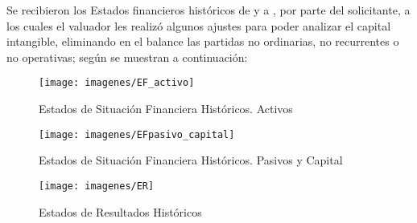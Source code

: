 Se recibieron los Estados financieros hist\'oricos de \EFde{} y a \EFhasta, por parte del  solicitante,  a los cuales el valuador les realiz\'o algunos ajustes para poder analizar el capital intangible, eliminando en el balance las partidas no ordinarias, no recurrentes o no operativas; seg\'un se muestran a continuaci\'on:

\begin{figure}[H]
\centering
\caption{Estados de Situaci\'on Financiera Hist\'oricos. Activos \EFdeHasta \label{fig:ESF}}
\texttt{[image: imagenes/EF\_activo]}\\[5pt]

\end{figure}
\begin{figure}[H]
\centering
\caption{Estados de Situaci\'on Financiera Hist\'oricos. Pasivos y Capital \EFdeHasta \label{fig:ESF_2}}
\texttt{[image: imagenes/EFpasivo\_capital]}\\

\end{figure}

\begin{figure}[H]
\centering
\caption{Estados de Resultados Hist\'oricos \EFdeHasta \label{fig:ESF_3}}
\texttt{[image: imagenes/ER]}\\
\end{figure}

